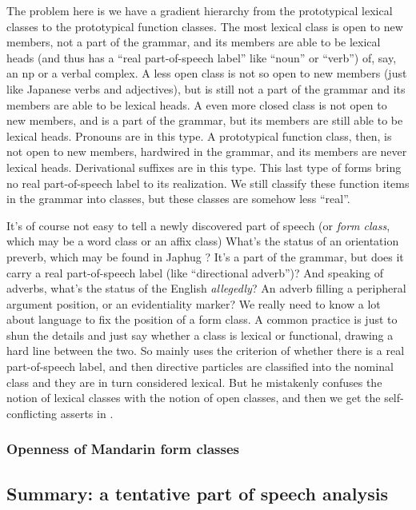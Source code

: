 \documentclass[UTF8, a4paper, oneside, scheme=plain]{ctexrep}
\newcommand*{\citesec}[1]{\S~{#1}}
\newcommand*{\term}[1]{\emph{#1}}
\newcommand{\corpus}[1]{\emph{#1}}
\begin{document}
The problem here is we have a gradient hierarchy 
from the prototypical lexical classes 
to the prototypical function classes.
The most lexical class is open to new members, 
not a part of the grammar,
and its members are able to be lexical heads
(and thus has a ``real part-of-speech label'' 
like ``noun'' or ``verb'') 
of, say, an \acs{np} or a verbal complex.
A less open class is not so open to new members 
(just like Japanese verbs and adjectives),
but is still not a part of the grammar 
and its members are able to be lexical heads. 
A even more closed class is not open to new members,
and is a part of the grammar,
but its members are still able to be lexical heads.
Pronouns are in this type.
A prototypical function class, then, 
is not open to new members, hardwired in the grammar, 
and its members are never lexical heads.
Derivational suffixes are in this type.
This last type of forms 
bring no real part-of-speech label to its realization.
We still classify these function items in the grammar into classes,
but these classes are somehow less ``real''.

It's of course not easy to tell a newly discovered part of speech 
(or \term{form class}, which may be a word class or an affix class)
What's the status of an orientation preverb, 
which may be found in Japhug \citep{jacques2021grammar}?
It's a part of the grammar,
but does it carry a real part-of-speech label (like ``directional adverb'')?
And speaking of adverbs, what's the status of the English \corpus{allegedly}?
An adverb filling a peripheral argument position,
or an evidentiality marker?
We really need to know a lot about language to fix the position of a form class.
A common practice is just to shun the details and just say whether a class is lexical or functional,
drawing a hard line between the two.
So \citet{zhudexigrammar} mainly uses the criterion of whether there is a real part-of-speech label,
and then directive particles are classified into the nominal class 
and they are in turn considered lexical.
But he mistakenly confuses the notion of lexical classes with the notion of open classes,
and then we get the self-conflicting asserts in \citet[\citesec{3.4}]{zhudexigrammar}.

\subsubsection{Openness of Mandarin form classes}

\subsection{Summary: a tentative part of speech analysis}
\end{document}
